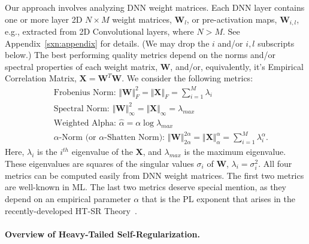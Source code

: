 Our approach involves analyzing DNN weight matrices.
Each DNN layer contains one or more layer 2D  $N\times M$ weight matrices, $\mathbf{W}_{l}$, or pre-activation maps, $\mathbf{W}_{i,l}$, e.g., extracted from 2D Convolutional layers, where $N > M$.
See Appendix~\ref{sxn:appendix} for details.
(We may drop the $i$ and/or $i,l$ subscripts below.)
The best performing quality metrics depend on the norms and/or spectral properties of each weight matrix,
$\mathbf{W}$, and/or, equivalently, it's Empirical Correlation Matrix, $\mathbf{X}=\mathbf{W}^{T}\mathbf{W}$.
We consider the following metrics:
\begin{eqnarray}
& & \text{Frobenius Norm: $\Vert\mathbf{W}\Vert^{2}_{F}=\Vert\mathbf{X}\Vert_{F}=\sum\nolimits_{i=1}^{M} \lambda_{i}$ } \\
& & \text{Spectral Norm: $\Vert\mathbf{W}\Vert_{\infty}^{2}=\Vert\mathbf{X}\Vert_{\infty}=\lambda_{max}$ } \\
& & \text{Weighted Alpha: $\hat{\alpha}=\alpha\log\lambda_{max}$ } \\
& & \text{$\alpha$-Norm (or $\alpha$-Shatten Norm): $\Vert\mathbf{W}\Vert^{2\alpha}_{2\alpha}=\Vert\mathbf{X}\Vert^{\alpha}_{\alpha}=\sum\nolimits_{i=1}^{M}\lambda_{i}^{\alpha}$. }
\end{eqnarray}
Here, $\lambda_{i}$ is the $i^{th}$ eigenvalue of the $\mathbf{X}$, and $\lambda_{max}$ is the maximum eigenvalue.
These eigenvalues are squares of the singular values $\sigma_{i}$ of $\mathbf{W}$, $\lambda_{i}=\sigma^{2}_{i}$.
All four metrics can be computed easily from DNN weight matrices.
The first two metrics are well-known in ML.
The last two metrics deserve special mention, as they depend on an empirical parameter $\alpha$ that is the PL exponent that arises in the recently-developed HT-SR Theory~\cite{MM18_TR, MM19_HTSR_ICML, MM20_SDM}.


\paragraph{Overview of Heavy-Tailed Self-Regularization.}


